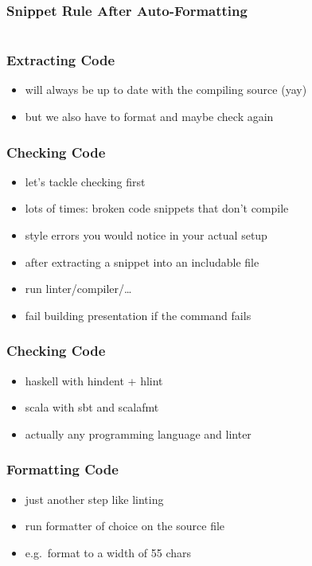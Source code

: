 \documentclass{beamer}
\begin{document}
\begin{frame}
  \frametitle{Snippet Rule \textemdash{} After Auto-Formatting}
  \begin{center}
    \inputminted[autogobble]{haskell}{snippets/haskell-snippet-rule.hs}
  \end{center}
\end{frame}

\begin{frame}
  \frametitle{Extracting Code}
  \begin{itemize}
  \item will always be up to date with the compiling source (yay)
  \item but we also have to format and maybe check again
  \end{itemize}
\end{frame}

\begin{frame}
  \frametitle{Checking Code}
  \begin{itemize}
  \item let's tackle checking first
  \item lots of times: broken code snippets that don't compile
  \item style errors you would notice in your actual setup
  \item after extracting a snippet into an includable file
  \item run linter/compiler/\ldots
  \item fail building presentation if the command fails
  \end{itemize}
\end{frame}

\begin{frame}
  \frametitle{Checking Code}
  \begin{itemize}
  \item haskell with hindent + hlint
  \item scala with sbt and scalafmt
  \item actually any programming language and linter
  \end{itemize}
\end{frame}

\begin{frame}
  \frametitle{Formatting Code}
  \begin{itemize}
  \item just another step like linting
  \item run formatter of choice on the source file
  \item e.g.\ format to a width of 55 chars
  \end{itemize}
\end{frame}
\end{document}

